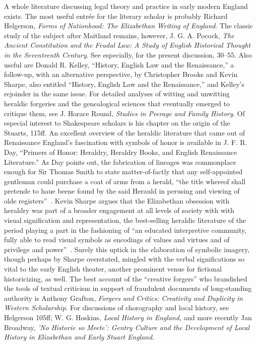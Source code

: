 A whole literature discussing legal theory and practice in early modern England exists. The most useful entrée for the literary scholar is probably Richard Helgerson, \emph{Forms of Nationhood: The Elizabethan Writing of England}.\nocite{helgerson_forms_1992} The classic study of the subject after Maitland remains, however, J. G. A. Pocock, \emph{The Ancient Constitution and the Feudal Law: A Study of English Historical Thought in the Seventeenth Century}.\nocite{pocock_ancient_1987} See especially, for the present discussion, 30--55. Also useful are Donald R. Kelley, ``History, English Law and the Renaissance,''\nocite{kelley_history_1974} a follow-up, with an alternative perspective, by Christopher Brooks and Kevin Sharpe, also entitled ``History, English Law and the Renaissance,'' \nocite{brooks_history_1976} and Kelley's rejoinder in the same issue. For detailed analyses of witting and unwitting heraldic forgeries and the genealogical sciences that eventually emerged to critique them, see J. Horace Round, \emph{Studies in Peerage and Family History}.\nocite{round_studies_1901} Of especial interest to Shakespeare scholars is his chapter on the origin of the Stuarts, 115ff. An excellent overview of the heraldic literature that came out of Renaissance England's fascination with symbols of honor is available in J. F. R. Day, ``Primers of Honor: Heraldry, Heraldry Books, and English Renaissance Literature.''\nocite{day_primers_1990} As Day points out, the fabrication of lineages was commonplace enough for Sir Thomas Smith to state matter-of-factly that any self-appointed gentleman could purchase a coat of arms from a herald, ``the title whereof shall pretende to haue beene found by the said Herauld in perusing and viewing of olde registers''~\cite[28]{smith_republica_1583}. Kevin Sharpe argues that the Elizabethan obsession with heraldry was part of a broader engagement at all levels of society with with visual signification and representation, the best-selling heraldic literature of the period playing a part in the fashioning of ``an educated interpretive community, fully able to read visual symbols as encodings of values and virtues and of privilege and power''~\cite[359]{sharpe_selling_2009}. Surely this uptick in the elaboration of symbolic imagery, though perhaps by Sharpe overstated, mingled with the verbal significations so vital to the early English theater, another prominent venue for fictional historicizing, as well. The best account of the ``creative forgers'' who brandished the tools of textual criticism in support of fraudulent documents of long-standing authority is Anthony Grafton, \emph{Forgers and Critics: Creativity and Duplicity in Western Scholarship}.\nocite{grafton_forgers_1990} For discussions of chorography and local history, see Helgerson 105ff; W. G. Hoskins, \emph{Local History in England,}\nocite{hoskins_local_1972} and more recently Jan Broadway, \emph{'No Historie so Meete': Gentry Culture and the Development of Local History in Elizabethan and Early Stuart England}.\nocite{broadway_no_2006}

